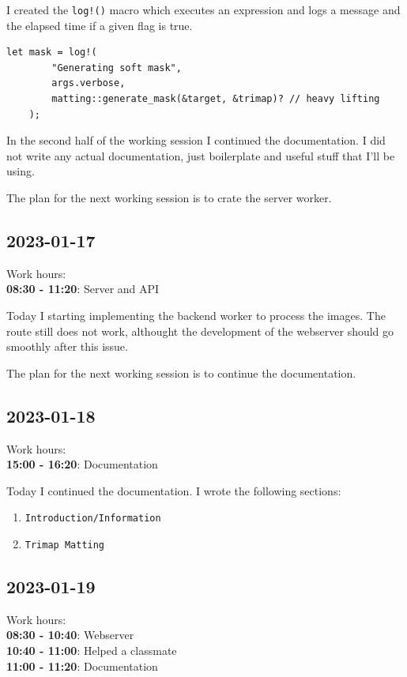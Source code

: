 \documentclass{article}
\begin{document}
I created the \lstinline[style=Rust]{log!()} macro which executes
an expression and logs a message and the elapsed time if a given flag is true.

\begin{lstlisting}[style=Rust, style=boxed]
    let mask = log!(
        "Generating soft mask",
        args.verbose,
        matting::generate_mask(&target, &trimap)? // heavy lifting
    );
\end{lstlisting}

In the second half of the working session I continued the documentation.
I did not write any actual documentation, just boilerplate and useful stuff that I'll be using.

The plan for the next working session is to crate the server worker.

\subsection{2023-01-17}

Work hours:\\
\textbf{08:30 - 11:20}: Server and API

Today I starting implementing the backend worker to process
the images. The route still does not work, althought the development
of the webserver should go smoothly after this issue.

The plan for the next working session is to continue the documentation.

\subsection{2023-01-18}

Work hours:\\
\textbf{15:00 - 16:20}: Documentation

Today I continued the documentation. I wrote the
following sections:
\begin{enumerate}
    \item \texttt{Introduction/Information}
    \item \texttt{Trimap Matting}
\end{enumerate}

\subsection{2023-01-19}

Work hours:\\
\textbf{08:30 - 10:40}: Webserver \\
\textbf{10:40 - 11:00}: Helped a classmate \\
\textbf{11:00 - 11:20}: Documentation
\end{document}
